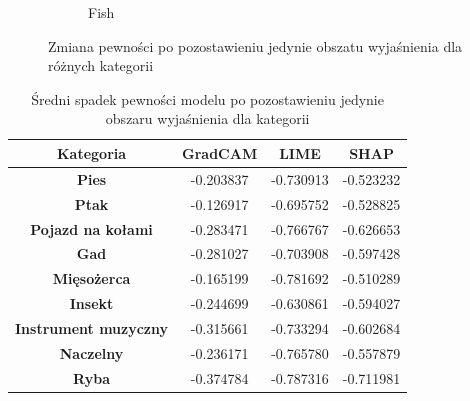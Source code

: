\begin{figure}[h]
\begin{subfigure}[b]{0.3\textwidth}
		\caption{Fish}  \label{rys:base_confidence_exp_fish}
	\end{subfigure}
	\caption{Zmiana pewności po pozostawieniu jedynie obszatu wyjaśnienia dla różnych kategorii}
	\label{rys:base_confidence_exp_category}
\end{figure}

\begin{table}[h]
	\centering
	\begin{tabular}{|c|c|c|c|}
		\hline
		\textbf{Kategoria}           & \textbf{GradCAM} & \textbf{LIME} & \textbf{SHAP} \\
		\hline
		\textbf{Pies}                & -0.203837        & -0.730913     & -0.523232     \\
		\hline
		\textbf{Ptak}                & -0.126917        & -0.695752     & -0.528825     \\
		\hline
		\textbf{Pojazd na kołami}    & -0.283471        & -0.766767     & -0.626653     \\
		\hline
		\textbf{Gad}                 & -0.281027        & -0.703908     & -0.597428     \\
		\hline
		\textbf{Mięsożerca}          & -0.165199        & -0.781692     & -0.510289     \\
		\hline
		\textbf{Insekt}              & -0.244699        & -0.630861     & -0.594027     \\
		\hline
		\textbf{Instrument muzyczny} & -0.315661        & -0.733294     & -0.602684     \\
		\hline
		\textbf{Naczelny}            & -0.236171        & -0.765780     & -0.557879     \\
		\hline
		\textbf{Ryba}                & -0.374784        & -0.787316     & -0.711981     \\
		\hline
	\end{tabular}
	\caption{Średni spadek pewności modelu po pozostawieniu jedynie obszaru wyjaśnienia dla kategorii}
	\label{tab:category_confidence_exp}
\end{table}

